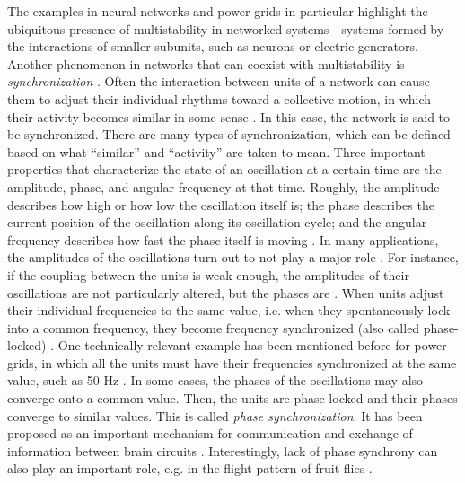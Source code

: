 The examples in neural networks and power grids in particular highlight the ubiquitous presence of multistability in networked systems - systems formed by the interactions of smaller subunits, such as neurons or electric generators.  Another phenomenon in networks that can coexist with multistability is \textit{synchronization} \cite{pikovsky2001synchronization, boccaletti2018synchronization}. Often the interaction between units of a network can cause them to adjust their individual rhythms toward a collective motion, in which their activity becomes similar in some sense \cite{pikovsky2001synchronization}. In this case, the network is said to be synchronized. There are many types of synchronization, which can be defined based on what ``similar'' and ``activity'' are taken to mean. Three important properties that characterize the state of an oscillation at a certain time are the amplitude, phase, and angular frequency at that time. Roughly, the amplitude describes how high or how low the oscillation itself is; the phase describes the current position of the oscillation along its oscillation cycle; and the angular frequency describes how fast the phase itself is moving \cite{pikovsky2001synchronization}.
In many applications, the amplitudes of the oscillations turn out to not play a major role \cite{pikovsky2001synchronization, arenas2008synchronization}. For instance, if the coupling between the units is weak enough, the amplitudes of their oscillations are not particularly altered, but the phases are \cite{pikovsky2001synchronization, strogatz2000from}. When units adjust their individual frequencies to the same value, i.e. when they spontaneously lock into a common frequency, they become frequency synchronized (also called phase-locked) \cite{pikovsky2001synchronization, strogatz2000from}. One technically relevant example has been mentioned before for power grids, in which all the units must have their frequencies synchronized at the same value, such as 50 Hz \cite{hellmann2020network}. In some cases, the phases of the oscillations may also converge onto a common value. Then, the units are phase-locked and their phases converge to similar values. This is called \textit{phase synchronization}. It has been proposed as an important mechanism for communication and exchange of information between brain circuits \cite{singer1999neuronal, fries2015rhythms, womelsdorf2007the}. Interestingly, lack of phase synchrony can also play an important role, e.g. in the flight pattern of fruit flies \cite{hurkey2023gap}. 

